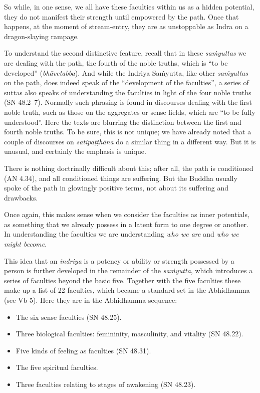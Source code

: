 \documentclass[12pt,openany]{book}%
\begin{document}
So while, in one sense, we all have these faculties within us as a hidden potential, they do not manifest their strength until empowered by the path. Once that happens, at the moment of stream-entry, they are as unstoppable as Indra on a dragon-slaying rampage.

To understand the second distinctive feature, recall that in these \textit{\textsanskrit{saṁyuttas}} we are dealing with the path, the fourth of the noble truths, which is “to be developed” (\textit{\textsanskrit{bhāvetabba}}). And while the Indriya \textsanskrit{Saṁyutta}, like other \textit{\textsanskrit{saṁyuttas}} on the path, does indeed speak of the “development of the faculties”, a series of suttas also speaks of understanding the faculties in light of the four noble truths (SN 48.2–7). Normally such phrasing is found in discourses dealing with the first noble truth, such as those on the aggregates or sense fields, which are “to be fully understood”. Here the texts are blurring the distinction between the first and fourth noble truths. To be sure, this is not unique; we have already noted that a couple of discourses on \textit{\textsanskrit{satipaṭṭhāna}} do a similar thing in a different way. But it is unusual, and certainly the emphasis is unique.

There is nothing doctrinally difficult about this; after all, the path is conditioned (AN 4.34), and all conditioned things are suffering. But the Buddha usually spoke of the path in glowingly positive terms, not about its suffering and drawbacks.

Once again, this makes sense when we consider the faculties as inner potentials, as something that we already possess in a latent form to one degree or another. In understanding the faculties we are understanding \emph{who we are} and \emph{who we might become}.

This idea that an \textit{indriya} is a potency or ability or strength possessed by a person is further developed in the remainder of the \textit{\textsanskrit{saṁyutta}}, which introduces a series of faculties beyond the basic five. Together with the five faculties these make up a list of 22 faculties, which became a standard set in the Abhidhamma (see Vb 5). Here they are in the Abhidhamma sequence:

\begin{itemize}%
\item The six sense faculties (SN 48.25).%
\item Three biological faculties: femininity, masculinity, and vitality (SN 48.22).%
\item Five kinds of feeling as faculties (SN 48.31).%
\item The five spiritual faculties.%
\item Three faculties relating to stages of awakening (SN 48.23).%
\end{itemize}
\end{document}
